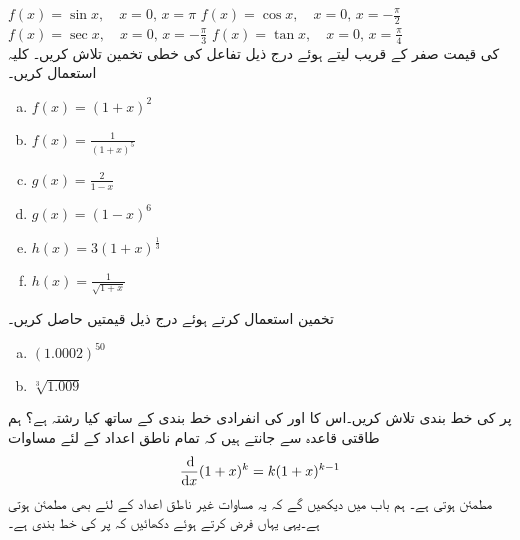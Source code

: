 $f(x)=\sin x,\quad x=0,\, x=\pi$
$f(x)=\cos x,\quad x=0,\, x=-\tfrac{\pi}{2}$
$f(x)=\sec x,\quad x=0,\, x=-\tfrac{\pi}{3}$
$f(x)=\tan x,\quad x=0,\, x=\tfrac{\pi}{4}$
\\
 کی قیمت صفر کے قریب لیتے ہوئے درج ذیل تفاعل کی خطی تخمین تلاش کریں۔ کلیہ  استعمال کریں۔
\begin{multicols}{3}
\begin{enumerate}[a.]
\item
$f(x)=(1+x)^2$
\item
$f(x)=\frac{1}{(1+x)^5}$
\item
$g(x)=\frac{2}{1-x}$
\item
$g(x)=(1-x)^6$
\item
$h(x)=3(1+x)^{\tfrac{1}{3}}$
\item
$h(x)=\frac{1}{\sqrt{1+x}}$
\end{enumerate}
\end{multicols}
\quad
تخمین  استعمال کرتے ہوئے درج ذیل قیمتیں حاصل کریں۔
\begin{multicols}{2}
\begin{enumerate}[a.]
\item
$(1.0002)^{50}$
\item
$\sqrt[3]{1.009}$
\end{enumerate}
\end{multicols}
 پر  کی خط بندی تلاش کریں۔اس کا  اور  کی انفرادی خط بندی کے ساتھ کیا رشتہ ہے؟
ہم طاقتی قاعدہ سے جانتے ہیں کہ تمام ناطق اعداد  کے لئے مساوات
\begin{align*}
\frac{\dif}{\dif x}(1+x)^k=k(1+x)^{k-1}
\end{align*}
مطمئن ہوتی ہے۔ ہم  باب  میں دیکھیں گے کہ یہ مساوات غیر ناطق اعداد کے لئے بھی مطمئن ہوتی ہے۔یہی یہاں فرض کرتے ہوئے دکھائیں کہ  پر  کی خط بندی  ہے۔

